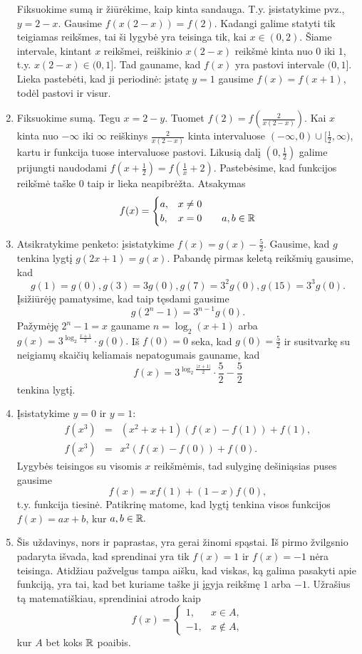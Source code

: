\begin{enumerate}
    Fiksuokime sumą ir žiūrėkime, kaip kinta sandauga. T.y. įsistatykime
    pvz., $y=2-x$. Gausime $f(x(2-x))=f(2)$. Kadangi galime statyti tik
    teigiamas reikšmes, tai ši lygybė yra teisinga tik, kai $x\in (0,2)$.
    Šiame intervale, kintant $x$ reikšmei, reiškinio $x(2-x)$ reikšmė kinta
    nuo $0$ iki $1$, t.y. $x(2-x)\in(0,1]$. Tad gauname, kad $f(x)$ yra
    pastovi intervale $(0,1]$. Lieka pastebėti, kad ji periodinė: įstatę
    $y=1$ gausime $f(x)=f(x+1)$, todėl pastovi ir visur.
\item
    Fiksuokime sumą. Tegu $x=2-y$. Tuomet $f(2)=f(\frac{2}{x(2-x)})$.
    Kai $x$ kinta nuo $-\infty$ iki $\infty$ reiškinys
    $\frac{2}{x(2-x)}$ kinta intervaluose
    $(-\infty,0)\cup[\frac{1}{2},\infty)$, kartu ir funkcija tuose
    intervaluose pastovi. Likusią dalį $(0,\frac{1}{2})$ galime
    prijungti naudodami $f(x+\frac{1}{2}) = f(\frac{1}{x}+2)$.
    Pastebėsime, kad funkcijos reikšmė taške 0 taip ir lieka
    neapibrėžta. Atsakymas $$f(x) = \begin{cases}a,& x\neq0 \\ b,& x= 0
    \text{      \ \ \ \ \   } a,b\in\mathbb R\end{cases}$$
\item
    Atsikratykime penketo: įsistatykime $f(x) = g(x) -\frac{5}{2}$.
    Gausime, kad $g$ tenkina lygtį $g(2x+1)=g(x)$. Pabandę pirmas keletą
    reikšmių gausime, kad $$g(1)=g(0), g(3)=3g(0), g(7)=3^2g(0), g(15) =
    3^3g(0).$$ Įsižiūrėję pamatysime, kad taip tęsdami gausime
    $$g(2^n-1)=3^{n-1}g(0).$$ Pažymėję $2^n-1 = x$ gauname $n =
    \log_2(x+1)$ arba $g(x)=3^{\log_2\frac{x+1}{2}}\cdot g(0).$ Iš
    $f(0)=0$ seka, kad $g(0)=\frac{5}{2}$ ir susitvarkę su neigiamų
    skaičių keliamais nepatogumais gauname, kad  $$f(x) =
    3^{\log_2\frac{|x+1|}{2}}\cdot \frac{5}{2} - \frac{5}{2}$$ tenkina
    lygtį.
\item
    Įsistatykime $y=0$ ir $y=1$:
    \begin{eqnarray*}
      f(x^3) &=& (x^2 + x + 1)(f(x)-f(1))+f(1),\\
      f(x^3) &=& x^2 (f(x)-f(0)) + f(0).
    \end{eqnarray*}
    Lygybės teisingos su visomis $x$ reikšmėmis, tad sulyginę dešiniąsias
    puses gausime $$f(x)=xf(1) + (1-x)f(0),$$ t.y. funkcija tiesinė.
    Patikrinę matome, kad lygtį tenkina visos funkcijos $f(x)=ax+b$, kur
    $a,b\in \mathbb R.$
\item
    Šis uždavinys, nors ir paprastas, yra gerai žinomi spąstai. Iš pirmo
    žvilgsnio padaryta išvada, kad sprendinai yra tik $f(x)=1$ ir
    $f(x)=-1$ nėra teisinga. Atidžiau pažvelgus tampa aišku, kad viskas, ką
    galima pasakyti apie funkciją, yra tai, kad bet kuriame taške ji įgyja
    reikšmę $1$ arba $-1$. Užrašius tą matematiškiau, sprendiniai atrodo
    kaip $$f(x) = \begin{cases}1,& x\in A, \\ -1,& x\not\in A,\end{cases}$$
    kur $A$ bet koks $\mathbb R$ poaibis.
\end{enumerate} 
